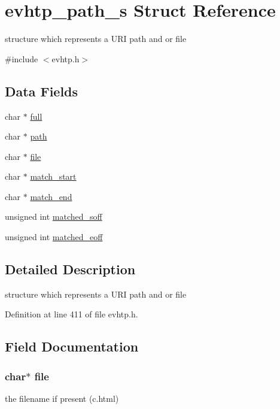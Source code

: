 \hypertarget{structevhtp__path__s}{\section{evhtp\-\_\-path\-\_\-s Struct Reference}
\label{structevhtp__path__s}
}


structure which represents a U\-R\-I path and or file  




{\ttfamily \#include $<$evhtp.\-h$>$}

\subsection*{Data Fields}
\begin{DoxyCompactItemize}
\item 
char $\ast$ \hyperlink{structevhtp__path__s_a3deff62337b4ec745307f4410d7ff6ce}{full}
\item 
char $\ast$ \hyperlink{structevhtp__path__s_a44196e6a5696d10442c29e639437196e}{path}
\item 
char $\ast$ \hyperlink{structevhtp__path__s_adf16cd437526a5c5e0e0af87745acbb8}{file}
\item 
char $\ast$ \hyperlink{structevhtp__path__s_a25d9dc60fbb26e1c4898184e1e46e9ab}{match\-\_\-start}
\item 
char $\ast$ \hyperlink{structevhtp__path__s_aa1f13c993b57860b101d02bc62bb801b}{match\-\_\-end}
\item 
unsigned int \hyperlink{structevhtp__path__s_af11f4fc41ab5561c5d430cedfa5e53d8}{matched\-\_\-soff}
\item 
unsigned int \hyperlink{structevhtp__path__s_ae9fc73e1697747df74873f20d91db690}{matched\-\_\-eoff}
\end{DoxyCompactItemize}


\subsection{Detailed Description}
structure which represents a U\-R\-I path and or file 

Definition at line 411 of file evhtp.\-h.



\subsection{Field Documentation}
\hypertarget{structevhtp__path__s_adf16cd437526a5c5e0e0af87745acbb8}{
\subsubsection[{file}]{\setlength{\rightskip}{0pt plus 5cm}char$\ast$ file}}\label{structevhtp__path__s_adf16cd437526a5c5e0e0af87745acbb8}
the filename if present (c.\-html) 

